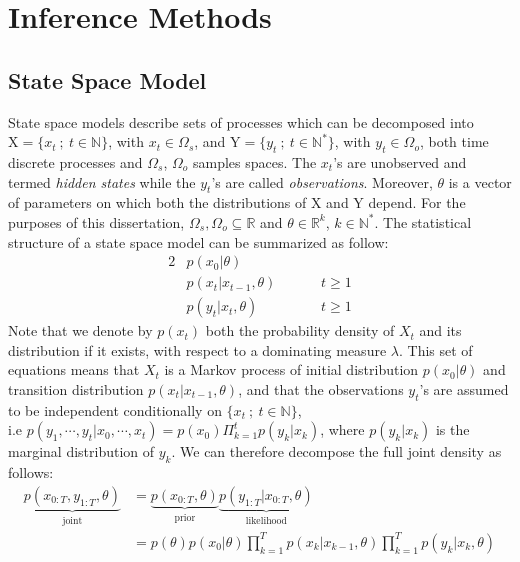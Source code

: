 \documentclass[12pt]{article}
\begin{document}
	\section{Inference Methods}
	\subsection{State Space Model}
	State space models describe sets of processes which can be decomposed into $\mathrm{X}=\{x_t \ ; \ t \in \mathbb{N}\}$, with $x_t \in \Omega_s$, and $\mathrm{Y}=\{y_t \ ; \ t \in \mathbb{N^*}\}$, with $y_t \in \Omega_o$, both time discrete processes and $\Omega_s$, $\Omega_o$ samples spaces. The $x_t$'s are unobserved and termed \emph{hidden states} while the $y_t$'s are called \emph{observations}. Moreover, $\theta$ is a vector of parameters on which both the distributions of $\mathrm{X}$ and $\mathrm{Y}$ depend. For the purposes of this dissertation, $\Omega_s, \Omega_o \subseteq \mathbb{R}$ and $\theta \in \mathbb{R}^k$, $k \in \mathbb{N^*}$. The statistical structure of a state space model can be summarized as follow: 
	\begin{alignat}{2}
	& p(x_0| \theta) &\\
	& p(x_t | x_{t-1}, \theta) \hspace{1cm} & t \ge 1\\
	& p(y_t | x_t, \theta)  & t \ge 1
	\end{alignat}
	Note that we denote by $p(x_t)$ both the probability density of $X_t$ and its distribution if it exists, with respect to a dominating measure $\lambda$. This set of equations means that $X_t$ is a Markov process of initial distribution $p(x_0| \theta)$ and transition distribution $p(x_t | x_{t-1}, \theta)$, and that the observations $y_t$'s are assumed to be independent conditionally on $\{x_t \ ; \ t \in \mathbb{N}\}$, \\ i.e $p(y_1, \cdots, y_t | x_0, \cdots, x_t) =p(x_0)\Pi_{k=1}^t p(y_k | x_k)$, where $p(y_k | x_k)$ is the marginal distribution of $y_k$. We can therefore decompose the full joint density as follows:
	\begin{align}
	\underbrace{p(x_{0:T}, y_{1:T}, \theta)}_{\text{joint}} & = \underbrace{p(x_{0:T}, \theta)}_{\text{prior}}\underbrace{p(y_{1:T}| x_{0:T}, \theta)}_{\text{likelihood}} \\
		& = p(\theta)p(x_0| \theta)\prod_{k=1}^{T}p(x_k|x_{k-1}, \theta)\prod_{k=1}^{T}p(y_k|x_k, \theta)
	\end{align}\\
	
\end{document}
